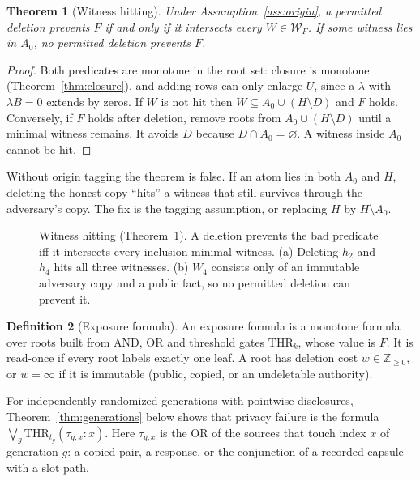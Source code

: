 \documentclass[pdflatex,sn-mathphys-num]{sn-jnl}
\theoremstyle{plain}
\newtheorem{theorem}{Theorem}
\theoremstyle{definition}
\newtheorem{definition}[theorem]{Definition}
\begin{document}
\begin{theorem}[Witness hitting]\label{thm:cuts}
Under Assumption~\ref{ass:origin}, a permitted deletion prevents $F$ if and only if it intersects every $W\in\mathcal W_F$. If some witness lies in $A_0$, no permitted deletion prevents $F$.
\end{theorem}
\begin{proof}
Both predicates are monotone in the root set: closure is monotone (Theorem~\ref{thm:closure}), and adding rows can only enlarge $U$, since a $\lambda$ with $\lambda B=0$ extends by zeros. If $W$ is not hit then $W\subseteq A_0\cup(H\setminus D)$ and $F$ holds. Conversely, if $F$ holds after deletion, remove roots from $A_0\cup(H\setminus D)$ until a minimal witness remains. It avoids $D$ because $D\cap A_0=\varnothing$. A witness inside $A_0$ cannot be hit.
\end{proof}

Without origin tagging the theorem is false. If an atom lies in both $A_0$ and $H$, deleting the honest copy ``hits'' a witness that still survives through the adversary's copy. The fix is the tagging assumption, or replacing $H$ by $H\setminus A_0$.

\begin{figure}[htbp]
\centering
\resizebox{\linewidth}{!}{}
\caption{Witness hitting (Theorem~\ref{thm:cuts}). A deletion prevents the bad predicate iff it intersects every inclusion-minimal witness. (a) Deleting $h_2$ and $h_4$ hits all three witnesses. (b) $W_4$ consists only of an immutable adversary copy and a public fact, so no permitted deletion can prevent it.}\label{fig:witness}
\end{figure}

\begin{definition}[Exposure formula]
An exposure formula is a monotone formula over roots built from AND, OR and threshold gates $\mathrm{THR}_k$, whose value is $F$. It is read-once if every root labels exactly one leaf. A root has deletion cost $w\in\mathbb{Z}_{\ge0}$, or $w=\infty$ if it is immutable (public, copied, or an undeletable authority).
\end{definition}

For independently randomized generations with pointwise disclosures, Theorem~\ref{thm:generations} below shows that privacy failure is the formula $\bigvee_g\mathrm{THR}_{t_g}(\tau_{g,x}:x)$. Here $\tau_{g,x}$ is the OR of the sources that touch index $x$ of generation $g$: a copied pair, a response, or the conjunction of a recorded capsule with a slot path.
\end{document}

